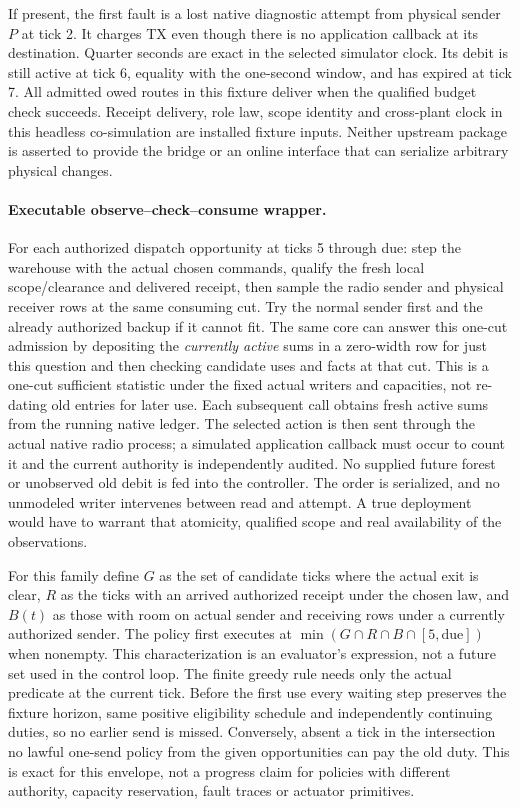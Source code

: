 \documentclass{article}
\begin{document}
If present, the first fault is a lost native diagnostic attempt
from physical sender \(P\) at tick 2. It charges TX even though
there is no application callback at its destination. Quarter
seconds are exact in the selected simulator clock. Its debit is
still active at tick 6, equality with the one-second window, and
has expired at tick 7. All admitted owed routes in this fixture deliver
when the qualified budget check succeeds. Receipt delivery, role law, scope identity and
cross-plant clock in this headless co-simulation are installed fixture
inputs. Neither upstream package is asserted to provide the bridge
or an online interface that can serialize arbitrary physical changes.

\paragraph{Executable observe--check--consume wrapper.}
For each authorized dispatch opportunity at ticks 5 through due:
step the warehouse with the actual chosen commands, qualify the
fresh local scope/clearance and delivered receipt, then sample
the radio sender and physical receiver rows at the same consuming
cut. Try the normal sender first and the already authorized
backup if it cannot fit. The same core can answer this one-cut
admission by depositing the \emph{currently active} sums in a
zero-width row for just this question and then checking candidate
uses and facts at that cut. This is a one-cut sufficient statistic
under the fixed actual writers and capacities, not re-dating old
entries for later use. Each subsequent call obtains fresh active
sums from the running native ledger. The selected action is then
sent through the actual native radio process; a simulated
application callback must occur to count it and the current
authority is independently audited. No supplied future forest
or unobserved old debit is fed into the controller. The order
is serialized, and no unmodeled writer intervenes between read
and attempt. A true deployment would have to warrant that
atomicity, qualified scope and real availability of the observations.

For this family define \(G\) as the set of candidate ticks where
the actual exit is clear, \(R\) as the ticks with an arrived
authorized receipt under the chosen law, and \(B(t)\) as those
with room on actual sender and receiving rows under a currently
authorized sender. The policy first executes at
\(\min(G\cap R\cap B\cap[5,\mathrm{due}])\) when nonempty.
This characterization is an evaluator's expression, not a
future set used in the control loop. The finite greedy rule
needs only the actual predicate at the current tick.
Before the first use every waiting step preserves the
fixture horizon, same positive eligibility schedule and
independently continuing duties, so no earlier send is missed.
Conversely, absent a tick in the intersection no lawful
one-send policy from the given opportunities can pay the
old duty. This is exact for this envelope, not a progress
claim for policies with different authority, capacity reservation,
fault traces or actuator primitives.
\end{document}
